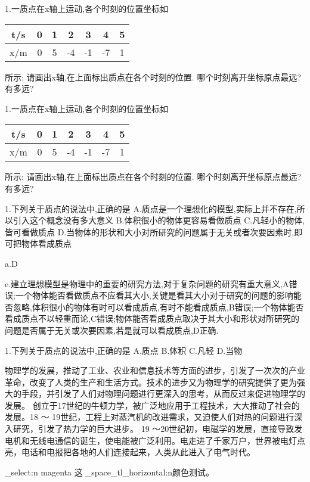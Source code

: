 \documentclass[a4paper,fontset = windowsnew]{ctexbook}
\begin{document}
\begin{jisuan}
  1.一质点在x轴上运动,各个时刻的位置坐标如
   \begin{tabular}{|*{7}{c|}}
      \hline
      t/s & 0 & 1 & 2 & 3 & 4 & 5\\
      \hline
      x/m & 0 & 5 & -4 & -1 & -7 & 1\\
      \hline
   \end{tabular}
   所示:
   \qitem 请画出x轴,在上面标出质点在各个时刻的位置.
   \qitem 哪个时刻离开坐标原点最远?有多远?

  1.一质点在x轴上运动,各个时刻的位置坐标如
   \begin{tabular}{|*{7}{c|}}
      \hline
      t/s & 0 & 1 & 2 & 3 & 4 & 5\\
      \hline
      x/m & 0 & 5 & -4 & -1 & -7 & 1\\
      \hline
   \end{tabular}
   所示:
   \qitem 请画出x轴,在上面标出质点在各个时刻的位置.
   \qitem 哪个时刻离开坐标原点最远?有多远?

\end{jisuan}

\begin{xuanze}[example]
   1.下列关于质点的说法中,正确的是
   A.质点是一个理想化的模型,实际上并不存在,所以引入这个概念没有多大意义
   B.体积很小的物体更容易看做质点
   C.凡轻小的物体,皆可看做质点
   D.当物体的形状和大小对所研究的问题属于无关或者次要因素时,即可把物体看成质点

   a.D

   e.建立理想模型是物理中的重要的研究方法,对于复杂问题的研究有重大意义,A错误;一个物体能否看做质点不应看其大小,关键是看其大小对于研究的问题的影响能否忽略,体积很小的物体有时可以看成质点,有时不能看成质点,B错误;一个物体能否看成质点不以轻重而论,C错误;物体能否看成质点取决于其大小和形状对所研究的问题是否属于无关或次要因素,若是就可以看成质点,D正确.

   1.下列关于质点的说法中,正确的是
   A.质点
   B.体积
   C.凡轻
   D.当物

\end{xuanze}

 物理学的发展，推动了工业、农业和信息技术等方面的进步，引发了一次次的产业革命，改变了人类的生产和生活方式。技术的进步又为物理学的研究提供了更为强大的手段，并引发了人们对物理问题进行更深入的思考，从而反过来促进物理学的发展。
 创立于17世纪的牛顿力学，被广泛地应用于工程技术，大大推动了社会的发展。18 ～ 19世纪，工程上对蒸汽机的改进需求，又迫使人们对热的问题进行深入研究，引发了热力学的巨大进步。
  19 ～20世纪初，电磁学的发展，直接导致发电机和无线电通信的诞生，使电能被广泛利用。电走进了千家万户，世界被电灯点亮，电话和电报把各地的人们连接起来，人类从此进入了电气时代。

\ExplSyntaxOn
\color_select:n {magenta} 这是\c_space_tl{}\skip_horizontal:n{\ccwd}颜色测试。
\ExplSyntaxOff
\end{document}
